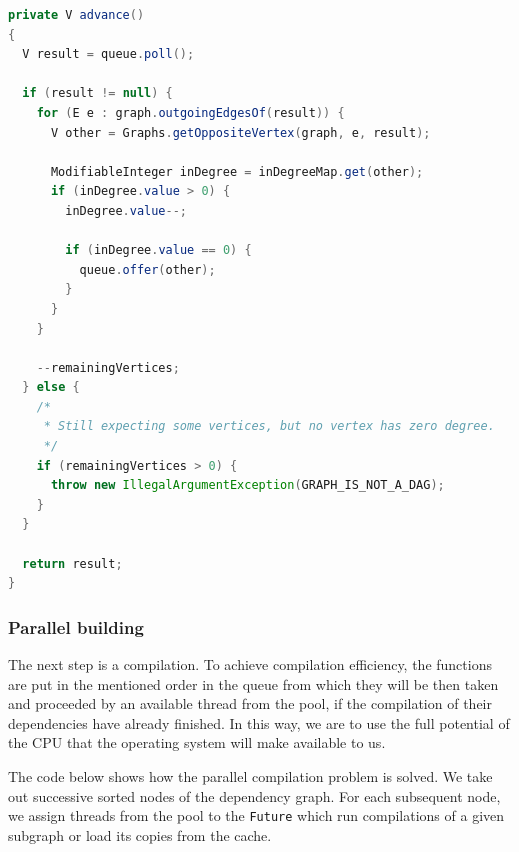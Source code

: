\begin{lstlisting}[language=Java, caption={Kahn's algorithm 2}, label={buildsystem:listing2}, caption={%
  Implementation of the algorithm from the JGraphT library pt. 2 \cite{JGRAPHT}%
}]
private V advance()
{
  V result = queue.poll();

  if (result != null) {
    for (E e : graph.outgoingEdgesOf(result)) {
      V other = Graphs.getOppositeVertex(graph, e, result);

      ModifiableInteger inDegree = inDegreeMap.get(other);
      if (inDegree.value > 0) {
        inDegree.value--;

        if (inDegree.value == 0) {
          queue.offer(other);
        }
      }
    }

    --remainingVertices;
  } else {
    /*
     * Still expecting some vertices, but no vertex has zero degree.
     */
    if (remainingVertices > 0) {
      throw new IllegalArgumentException(GRAPH_IS_NOT_A_DAG);
    }
  }

  return result;
}
\end{lstlisting}

\hypertarget{parallel-building}{%
\subsubsection{Parallel building}\label{parallel-building}}

The next step is a compilation. To achieve compilation efficiency, the
functions are put in the mentioned order in the queue from which they
will be then taken and proceeded by an available thread from the pool, if the compilation of their
dependencies have already finished. In this way, we are to use the full
potential of the CPU that the operating system will make available to
us.

The code below shows how the parallel compilation problem is solved.
We take out successive sorted nodes of the dependency graph.
For each subsequent node, we assign threads from the pool to the 
\texttt{Future} which run compilations of a given subgraph
or load its copies from the cache.

